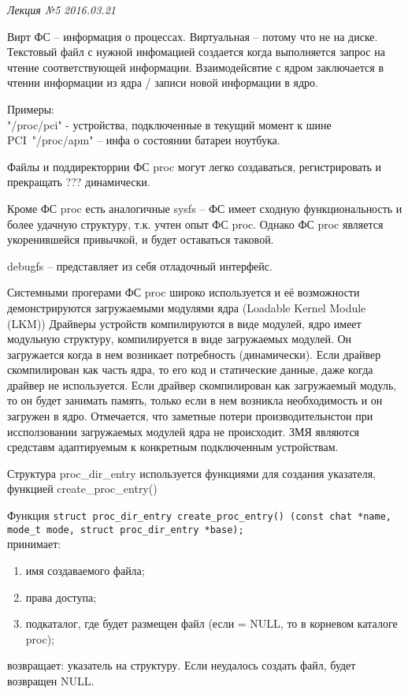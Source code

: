 \clearpage
\begin{flushright}
	\textit{Лекция №5}
	\textit{2016.03.21}
\end{flushright}

Вирт ФС – информация о процессах. Виртуальная – потому что не на диске. Текстовый файл с нужной инфомацией создается когда выполняется запрос на чтение соответствующей информации.
Взаимодейсвтие с ядром заключается в чтении информации из ядра / записи новой информации в ядро.

Примеры:\\
"/proc/pci" - устройства, подключенные в текущий момент к шине PCI\
"/proc/apm" – инфа о состоянии батареи ноутбука.

Файлы и поддиректоррии ФС proc могут легко создаваться, регистрировать и прекращать ??? динамически. 

Кроме ФС proc есть аналогичные sysfs – ФС имеет сходную функциональность и более удачную структуру, т.к. учтен опыт ФС  proc. Однако ФС proc является укоренившейся привычкой, и будет оставаться таковой.

debugfs – представляет из себя отладочный интерфейс.

Системными прогерами ФС proc широко используется и её возможности демонстрируются загружаемыми модулями ядра (Loadable Kernel Module (LKM))
Драйверы устройств компилируются в виде модулей, ядро имеет модульную структуру, компилируется в виде загружаемых модулей. Он загружается когда в нем возникает потребность (динамически). Если драйвер скомпилирован как часть ядра, то его код и статические данные, даже когда драйвер не используется. Если драйвер скомпилирован как загружаемый модуль, то он будет занимать память, только если в нем возникла необходимость и он загружен в ядро. Отмечается, что заметные потери производительнстои при иссползовании загружаемых модулей ядра не происходит. ЗМЯ являются средставм адаптируемым к конкретным подключенным устройствам. 

 

Структура proc\_dir\_entry используется функциями для создания указателя, функцией create\_proc\_entry()

Функция \verb|struct proc_dir_entry create_proc_entry() (const chat *name, mode_t mode, struct proc_dir_entry *base);|\\
принимает:
\begin{enumerate}
	\item имя создаваемого файла;
	\item права доступа;
	\item подкаталог, где будет размещен файл (если = NULL, то в корневом каталоге proc); 
\end{enumerate}
возвращает: указатель на структуру. Если неудалось создать файл, будет возвращен NULL.

